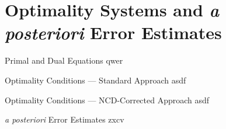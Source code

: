 \section{Optimality Systems and \textit{a posteriori} Error Estimates}

\begin{frame}{Primal and Dual Equations}
    qwer
\end{frame}

\begin{frame}{Optimality Conditions --- Standard Approach}
    asdf
\end{frame}

\begin{frame}{Optimality Conditions --- NCD-Corrected Approach}
    asdf
\end{frame}

\begin{frame}{\textit{a posteriori} Error Estimates}
    zxcv
\end{frame}